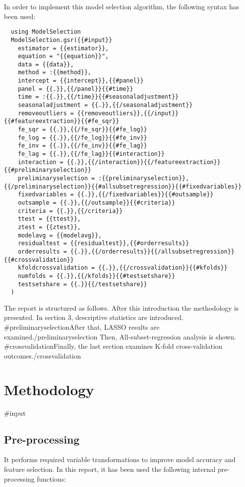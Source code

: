 \documentclass{article}
\begin{document}
In order to implement this model selection algorithm, the following syntax has been used:

\begin{lstlisting} 
  using ModelSelection
  ModelSelection.gsr({{#input}}
    estimator = {{estimator}},
    equation = "{{equation}}",
    data = {{data}},
    method = :{{method}},
    intercept = {{intercept}},{{#panel}}
    panel = {{.}},{{/panel}}{{#time}}
    time = :{{.}},{{/time}}{{#seasonaladjustment}}
    seasonaladjustment = {{.}},{{/seasonaladjustment}}
    removeoutliers = {{removeoutliers}},{{/input}}{{#featureextraction}}{{#fe_sqr}}
    fe_sqr = {{.}},{{/fe_sqr}}{{#fe_log}}
    fe_log = {{.}},{{/fe_log}}{{#fe_inv}}
    fe_inv = {{.}},{{/fe_inv}}{{#fe_lag}}
    fe_lag = {{.}},{{/fe_lag}}{{#interaction}}
    interaction = {{.}},{{/interaction}}{{/featureextraction}}{{#preliminaryselection}}
    preliminaryselection = :{{preliminaryselection}},{{/preliminaryselection}}{{#allsubsetregression}}{{#fixedvariables}}
    fixedvariables = {{.}},{{/fixedvariables}}{{#outsample}}
    outsample = {{.}},{{/outsample}}{{#criteria}}
    criteria = {{.}},{{/criteria}}
    ttest = {{ttest}},
    ztest = {{ztest}},
    modelavg = {{modelavg}},
    residualtest = {{residualtest}},{{#orderresults}}
    orderresults = {{.}},{{/orderresults}}{{/allsubsetregression}}{{#crossvalidation}}
    kfoldcrossvalidation = {{.}},{{/crossvalidation}}{{#kfolds}}
    numfolds = {{.}},{{/kfolds}}{{#testsetshare}}
    testsetshare = {{.}}{{/testsetshare}}
  )
\end{lstlisting}

The report is structured as follows. After this introduction the methodology is presented. In section 3, descriptive statistics are introduced. {{#preliminaryselection}}After that, LASSO results are examined.{{/preliminaryselection}} Then, All-subset-regression analysis is shown. {{#crossvalidation}}Finally, the last section examines K-fold cross-validation outcomes.{{/crossvalidation}}

\section{Methodology}

{{#input}}
\subsection{Pre-processing}
It performs required variable transformations to improve model accuracy and feature selection. In this report, it has been used the following internal pre-processing functions:
\end{document}
